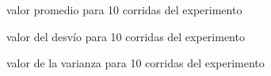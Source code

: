 \documentclass{article}
\begin{document}
\begin{figure}[!htbp]
  \begin{mytikzresize}{0.6\textwidth}
    \centering
    
    \caption{valor promedio para 10 corridas del experimento}
  \end{mytikzresize}
\end{figure}

\begin{figure}[!htbp]
  \begin{mytikzresize}{0.6\textwidth}
    \centering
    
    \caption{valor del desvío para 10 corridas del experimento}
  \end{mytikzresize}
\end{figure}

\begin{figure}[!htbp]
  \begin{mytikzresize}{0.6\textwidth}
    \centering
    
    \caption{valor de la varianza para 10 corridas del experimento}
  \end{mytikzresize}
\end{figure}

%
%
\end{document}
